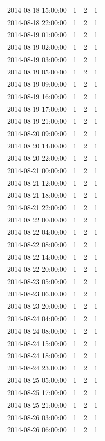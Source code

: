 \begin{tabular}{lrrr}
2014-08-18 15:00:00 & 1 & 2 & 1 \\
2014-08-18 22:00:00 & 1 & 2 & 1 \\
2014-08-19 01:00:00 & 1 & 2 & 1 \\
2014-08-19 02:00:00 & 1 & 2 & 1 \\
2014-08-19 03:00:00 & 1 & 2 & 1 \\
2014-08-19 05:00:00 & 1 & 2 & 1 \\
2014-08-19 09:00:00 & 1 & 2 & 1 \\
2014-08-19 16:00:00 & 1 & 2 & 1 \\
2014-08-19 17:00:00 & 1 & 2 & 1 \\
2014-08-19 21:00:00 & 1 & 2 & 1 \\
2014-08-20 09:00:00 & 1 & 2 & 1 \\
2014-08-20 14:00:00 & 1 & 2 & 1 \\
2014-08-20 22:00:00 & 1 & 2 & 1 \\
2014-08-21 00:00:00 & 1 & 2 & 1 \\
2014-08-21 12:00:00 & 1 & 2 & 1 \\
2014-08-21 18:00:00 & 1 & 2 & 1 \\
2014-08-21 22:00:00 & 1 & 2 & 1 \\
2014-08-22 00:00:00 & 1 & 2 & 1 \\
2014-08-22 04:00:00 & 1 & 2 & 1 \\
2014-08-22 08:00:00 & 1 & 2 & 1 \\
2014-08-22 14:00:00 & 1 & 2 & 1 \\
2014-08-22 20:00:00 & 1 & 2 & 1 \\
2014-08-23 05:00:00 & 1 & 2 & 1 \\
2014-08-23 06:00:00 & 1 & 2 & 1 \\
2014-08-23 20:00:00 & 1 & 2 & 1 \\
2014-08-24 04:00:00 & 1 & 2 & 1 \\
2014-08-24 08:00:00 & 1 & 2 & 1 \\
2014-08-24 15:00:00 & 1 & 2 & 1 \\
2014-08-24 18:00:00 & 1 & 2 & 1 \\
2014-08-24 23:00:00 & 1 & 2 & 1 \\
2014-08-25 05:00:00 & 1 & 2 & 1 \\
2014-08-25 17:00:00 & 1 & 2 & 1 \\
2014-08-25 21:00:00 & 1 & 2 & 1 \\
2014-08-26 03:00:00 & 1 & 2 & 1 \\
2014-08-26 06:00:00 & 1 & 2 & 1 \\

\end{tabular}
